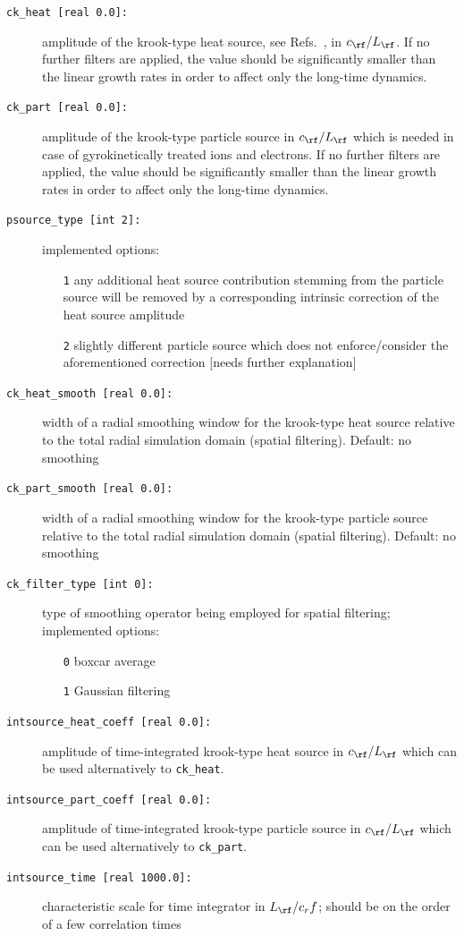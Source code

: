 \documentclass[12pt]{article}
\begin{document}
\begin{description}
\item[\texttt{ck\_heat [real 0.0]:}] amplitude of the krook-type heat source, see Refs.~\cite{LapillonnePhD,gene2,ToldPhD}, in $c_\rf/L_\rf$. If no further filters are applied,
the value should be significantly smaller than the linear growth rates in order to affect only the long-time dynamics.
\item[\texttt{ck\_part [real 0.0]:}] amplitude of the krook-type particle source\cite{ToldPhD} in $c_\rf/L_\rf$ which is needed in case of gyrokinetically treated ions and electrons.
If no further filters are applied, the value should be significantly smaller than the linear growth rates in order to affect only the long-time dynamics.
\item[\texttt{psource\_type [int 2]:}] implemented options:
\begin{itemize}
 \item [{\tt 1}] any additional heat source contribution stemming from the particle source will be removed by a corresponding intrinsic correction of the heat source amplitude
 \item [{\tt 2}] slightly different particle source which does not enforce/consider the aforementioned correction [needs further explanation]
\end{itemize}
\item[\texttt{ck\_heat\_smooth [real 0.0]:}] width of a radial smoothing window for the krook-type heat source relative to the total radial simulation domain (spatial filtering). Default: no smoothing
\item[\texttt{ck\_part\_smooth [real 0.0]:}] width of a radial smoothing window for the krook-type particle source relative to the total radial simulation domain (spatial filtering). Default: no smoothing
\item[\texttt{ck\_filter\_type [int 0]:}] type of smoothing operator being employed for spatial filtering; implemented options:
\begin{itemize}
 \item [{\tt 0}] boxcar average
 \item [{\tt 1}] Gaussian filtering
\end{itemize}
\item[\texttt{intsource\_heat\_coeff [real 0.0]:}] amplitude of time-integrated krook-type heat source in $c_\rf/L_\rf$ which can be used alternatively to \texttt{ck\_heat}.
\item[\texttt{intsource\_part\_coeff [real 0.0]:}] amplitude of time-integrated krook-type particle source in $c_\rf/L_\rf$ which can be used alternatively to \texttt{ck\_part}.
\item[\texttt{intsource\_time [real 1000.0]:}] characteristic scale for time integrator in $L_\rf/c_rf$; should be on the order of a few correlation times
\end{description}
\end{document}
